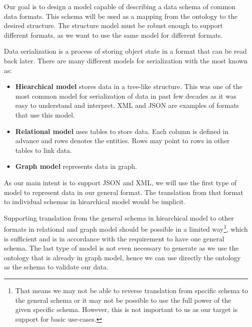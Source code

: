 \smallskip

Our goal is to design a model capable of describing a data schema of common data formats. This schema will be used as a mapping from the ontology to the desired structure. The structure model must be robust enough to support different formats, as we want to use the same model for different formats.

Data serialization is a process of storing object state in a format that can be read back later. There are many different models for serialization with the most known as:
\begin{itemize}
    \item \textbf{Hiearchical model} stores data in a tree-like structure. This was one of the most common model for serialization of data in past few decades as it was easy to understand and interpret. XML and JSON are examples of formats that use this model.
    \item \textbf{Relational model} uses tables to store data. Each column is defined in advance and rows denotes the entities. Rows may point to rows in other tables to link data.
    \item \textbf{Graph model} represents data in graph.
\end{itemize}


As our main intent is to support JSON and XML, we will use the first type of model to represent data in our general format. The translation from that format to individual schemas in hiearchical model would be implicit.

Supporting translation from the general schema in hiearchical model to other formats in relational and graph model should be possible in a limited way\footnote{That means we may not be able to reverse translation from specific schema to the general schema or it may not be possible to use the full power of the given specific schema. However, this is not important to us as our target is support for basic use-cases.}, which is sufficient and is in accordance with the requirement to have one general schema. The last type of model is not even necessary to generate as we use the ontology that is already in graph model, hence we can use directly the ontology as the schema to validate our data.

